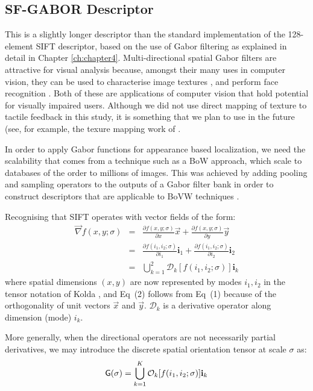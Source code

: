 \subsection{SF-GABOR Descriptor}
This is a slightly longer descriptor than the standard implementation of the 128-element SIFT descriptor, based on the use of Gabor filtering as explained in detail in Chapter \ref{ch:chapter4}.  Multi-directional spatial Gabor filters are attractive for visual analysis because, amongst their many uses in computer vision, they can be used to characterise image textures \citep{jain1990unsupervised,weldon1996efficient,adi2009texture}, and perform face recognition \citep{yang2013gabor}. Both of these are applications of computer vision that hold potential for visually impaired users. Although we did not use direct mapping of texture to tactile feedback in this study, it is something that we plan to use in the future (see, for example, the texure mapping work of \cite{adi2009texture}. 

In order to apply Gabor functions for appearance based localization, we need the scalability that comes from a technique such as a BoW approach, which scale to databases of the order to millions of images. This was achieved by adding pooling and sampling operators to the outputs of a Gabor filter bank in order to construct descriptors that are applicable to BoVW techniques \citep{nister2006scalable}.  

Recognising that SIFT operates with vector fields of the form:
\begin{eqnarray}
\vec{\nabla} f(x,y;\sigma) &=& \frac{\partial f(x,y;\sigma)}{\partial x}\vec{x} + \frac{\partial f(x,y;\sigma)}{\partial y}\vec{y}\nonumber \\
&=& \frac{\partial f(i_1,i_2;\sigma)}{\partial i_1}\mathbf{i}_1 + \frac{\partial f(i_1,i_2;\sigma)}{\partial i_2}\mathbf{i}_2\\
&=& \bigcup_{k=1}^2 \mathcal{D}_k [ f(i_1,i_2;\sigma) ] \mathbf{i}_k 
\end{eqnarray}
where spatial dimensions $(x,y)$ are now represented by modes $i_1,i_2$ in the tensor notation of Kolda \citep{kolda2009tensor}, and Eq~(2) follows from Eq~(1) because of the orthogonality of unit vectors $\vec{x}$ and $\vec{y}$.  $\mathcal{D}_k$ is a derivative operator along dimension (mode) $i_k$. 

More generally, when the directional operators are not necessarily partial derivatives, we may introduce the discrete spatial orientation tensor at scale $\sigma$ as:
\begin{equation}
\mathsf{G(\sigma)}  = \bigcup_{k=1}^K \mathcal{O}_k [ f(i_1,i_2;\sigma) ] \mathbf{i}_k 
\label{eq:IntroG}
\end{equation}

